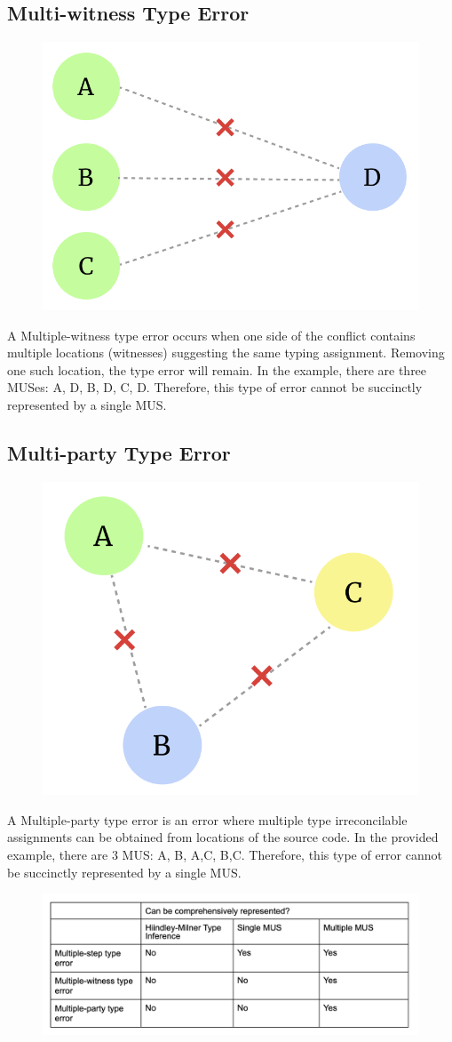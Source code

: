 \subsection{Multi-witness Type Error}
\begin{figure}[hbt]
  \includegraphics[width=0.5\linewidth]{Multi-witness}
  \caption{}
\end{figure}
A Multiple-witness type error occurs when one side of the conflict contains multiple locations (witnesses) suggesting the same typing assignment. Removing one such location, the type error will remain. In the example, there are three MUSes: {A, D}, {B, D}, {C, D}. Therefore, this type of error cannot be succinctly represented by a single MUS.

\subsection{Multi-party Type Error}
\begin{figure}[hbt]
  \includegraphics[width=0.5\linewidth]{Multi-party}
  \caption{}
\end{figure}

A Multiple-party type error is an error where multiple type irreconcilable assignments can be obtained from locations of the source code. In the provided example, there are 3 MUS: {A, B}, {A,C}, {B,C}. Therefore, this type of error cannot be succinctly represented by a single MUS.

\begin{figure}[hbt]
  \includegraphics[width=\linewidth]{Compare}
  \caption{}
\end{figure}

